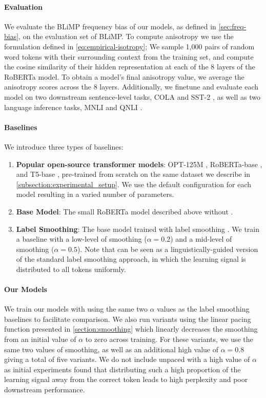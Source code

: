 \paragraph{Evaluation} We evaluate the BLiMP frequency bias of our models, as defined in \cref{sec:freq-bias}, on the evaluation set of BLiMP. To compute anisotropy we use the formulation defined in \cref{eq:empirical-isotropy}; We sample 1,000 pairs of random word tokens with their surrounding context from the training set, and compute the cosine similarity of their hidden representation at each of the 8 layers of the RoBERTa model. To obtain a model's final anisotropy value, we average the anisotropy scores across the 8 layers. Additionally, we finetune and evaluate each model on two downstream sentence-level tasks, COLA \citep{warstadt2019cola} and SST-2 \citep{socher2013sst}, as well as two language inference tasks, MNLI \citep{williams2018mnli} and QNLI \citep{rajpurkar2016squad, wang2018glue}.


\paragraph{Baselines}

We introduce three types of baselines: 
\begin{enumerate}
    \item \textbf{Popular open-source transformer models}: OPT-125M \citep{zhang2022opt}, RoBERTa-base \citep{liu2019roberta}, and T5-base \citep{raffel2020t5}, pre-trained from scratch on the same dataset we describe in \cref{subsection:experimental_setup}. We use the default configuration for each model resulting in a varied number of parameters.
    \item \textbf{Base Model}: The small RoBERTa model described above without \smoothing.
    \item \textbf{Label Smoothing}: The base model trained with label smoothing \citep{szegedy2016rethinking}.  We train a baseline with a low-level of smoothing ($\alpha=0.2$) and a mid-level of smoothing ($\alpha=0.5$). Note that \smoothing can be seen as a linguistically-guided version of the standard label smoothing approach, in which the learning signal is distributed to all tokens uniformly.
\end{enumerate}


\paragraph{Our Models} We train our models with \smoothing using the same two $\alpha$ values as the label smoothing baselines to facilitate comparison. We also run variants using the linear pacing function presented in \cref{section:smoothing} which linearly decreases the smoothing from an initial value of $\alpha$ to zero across training. For these variants, we use the same two values of smoothing, as well as an additional high value of $\alpha=0.8$ giving a total of five \smoothing variants. We do not include unpaced \smoothing with a high value of $\alpha$ as initial experiments found that distributing such a high proportion of the learning signal away from the correct token leads to high perplexity and poor downstream performance.

